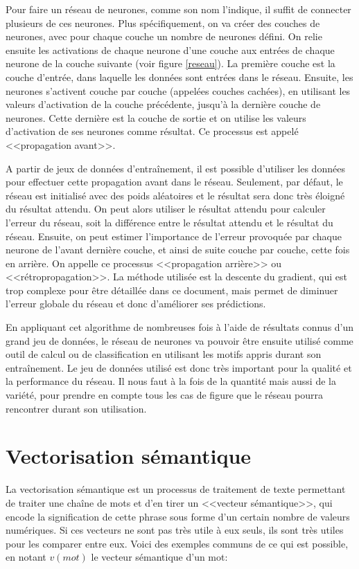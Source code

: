 \documentclass[openany, 11pt]{memoir}
\begin{document}
\bigskip
Pour faire un réseau de neurones, comme son nom l'indique, il suffit de connecter plusieurs de ces neurones. Plus spécifiquement, on va créer des couches de neurones, avec pour chaque couche un nombre de neurones défini. On relie ensuite les activations de chaque neurone d'une couche aux entrées de chaque neurone de la couche suivante (voir figure \ref{reseau}). La première couche est la couche d'entrée, dans laquelle les données sont entrées dans le réseau. Ensuite, les neurones s'activent couche par couche (appelées couches cachées), en utilisant les valeurs d'activation de la couche précédente, jusqu'à la dernière couche de neurones. Cette dernière est la couche de sortie et on utilise les valeurs d'activation de ses neurones comme résultat. Ce processus est appelé <<propagation avant>>.

\bigskip
A partir de jeux de données d'entraînement, il est possible d'utiliser les données pour effectuer cette propagation avant dans le réseau. Seulement, par défaut, le réseau est initialisé avec des poids aléatoires et le résultat sera donc très éloigné du résultat attendu. On peut alors utiliser le résultat attendu pour calculer l'erreur du réseau, soit la différence entre le résultat attendu et le résultat du réseau. Ensuite, on peut estimer l'importance de l'erreur provoquée par chaque neurone de l'avant dernière couche, et ainsi de suite couche par couche, cette fois en arrière. On appelle ce processus <<propagation arrière>> ou <<rétropropagation>>. La méthode utilisée est la descente du gradient, qui est trop complexe pour être détaillée dans ce document, mais permet de diminuer l'erreur globale du réseau et donc d'améliorer ses prédictions.

En appliquant cet algorithme de nombreuses fois à l'aide de résultats connus d'un grand jeu de données, le réseau de neurones va pouvoir être ensuite utilisé comme outil de calcul ou de classification en utilisant les motifs appris durant son entraînement. Le jeu de données utilisé est donc très important pour la qualité et la performance du réseau. Il nous faut à la fois de la quantité mais aussi de la variété, pour prendre en compte tous les cas de figure que le réseau pourra rencontrer durant son utilisation.

\section{Vectorisation sémantique}
\label{vectorisationsemantique}

La vectorisation sémantique est un processus de traitement de texte permettant de traiter une chaîne de mots et d'en tirer un <<vecteur sémantique>>, qui encode la signification de cette phrase sous forme d'un certain nombre de valeurs numériques. Si ces vecteurs ne sont pas très utile à eux seuls, ils sont très utiles pour les comparer entre eux. Voici des exemples communs de ce qui est possible, en notant $v(mot)$ le vecteur sémantique d'un mot:
\end{document}
